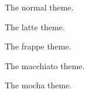 \documentclass{article}
\begin{document}
\begin{figure}
  \centering
  \caption{The normal theme.}
\end{figure}

\begin{figure}
  \centering
  \caption{The latte theme.}
\end{figure}

\begin{figure}
  \centering
  \caption{The frappe theme.}
\end{figure}

\begin{figure}
  \centering
  \caption{The macchiato theme.}
\end{figure}

\begin{figure}
  \centering
  \caption{The mocha theme.}
\end{figure}
\end{document}
